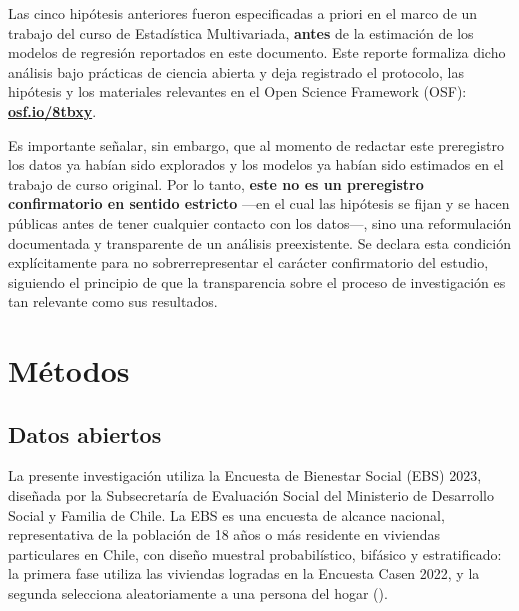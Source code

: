 \documentclass[
  spanish,
  a4paper,
  oneside]{scrbook}
\begin{document}
\begin{tcolorbox}[enhanced jigsaw, arc=.35mm, bottomrule=.15mm, bottomtitle=1mm, breakable, colback=white, colbacktitle=quarto-callout-important-color!10!white, colframe=quarto-callout-important-color-frame, coltitle=black, left=2mm, leftrule=.75mm, opacityback=0, opacitybacktitle=0.6, rightrule=.15mm, title=\textcolor{quarto-callout-important-color}{\faExclamation}\hspace{0.5em}{Nota de transparencia metodológica}, titlerule=0mm, toprule=.15mm, toptitle=1mm]

Las cinco hipótesis anteriores fueron especificadas a priori en el marco
de un trabajo del curso de Estadística Multivariada, \textbf{antes} de
la estimación de los modelos de regresión reportados en este documento.
Este reporte formaliza dicho análisis bajo prácticas de ciencia abierta
y deja registrado el protocolo, las hipótesis y los materiales
relevantes en el Open Science Framework (OSF):
\textbf{\href{https://osf.io/8tbxy}{osf.io/8tbxy}}.

Es importante señalar, sin embargo, que al momento de redactar este
preregistro los datos ya habían sido explorados y los modelos ya habían
sido estimados en el trabajo de curso original. Por lo tanto,
\textbf{este no es un preregistro confirmatorio en sentido estricto}
---en el cual las hipótesis se fijan y se hacen públicas antes de tener
cualquier contacto con los datos---, sino una reformulación documentada
y transparente de un análisis preexistente. Se declara esta condición
explícitamente para no sobrerrepresentar el carácter confirmatorio del
estudio, siguiendo el principio de que la transparencia sobre el proceso
de investigación es tan relevante como sus resultados.

\end{tcolorbox}


\chapter{Métodos}\label{muxe9todos}

\section{Datos abiertos}\label{datos-abiertos}

La presente investigación utiliza la Encuesta de Bienestar Social (EBS)
2023, diseñada por la Subsecretaría de Evaluación Social del Ministerio
de Desarrollo Social y Familia de Chile. La EBS es una encuesta de
alcance nacional, representativa de la población de 18 años o más
residente en viviendas particulares en Chile, con diseño muestral
probabilístico, bifásico y estratificado: la primera fase utiliza las
viviendas logradas en la Encuesta Casen 2022, y la segunda selecciona
aleatoriamente a una persona del hogar
().
\end{document}
